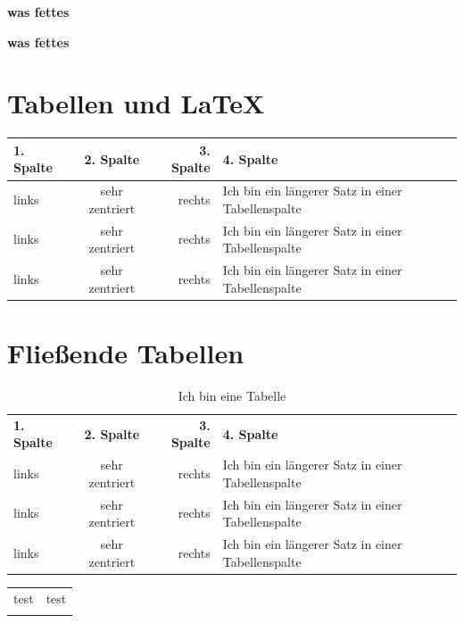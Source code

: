 \documentclass[12pt,ngerman,parskip=half]{scrreprt}
\begin{document}
\textbf{was fettes}

{\bfseries was fettes}


\section{Tabellen und \LaTeX}

\begin{tabular}{|l|c|r|p{6cm}|} \hline
1. Spalte & 2. Spalte & 3. Spalte & 4. Spalte \\ \hline
links & sehr zentriert&   rechts  & Ich bin ein längerer Satz in einer Tabellenspalte  \\ \hline
links & sehr zentriert&   rechts  & Ich bin ein längerer Satz in einer Tabellenspalte  \\ \hline
links & sehr zentriert&   rechts  & Ich bin ein längerer Satz in einer Tabellenspalte  \\ \hline
\end{tabular}

\section{Fließende Tabellen}

\blindtext[2]

\begin{table}
\begin{center}
\caption{Ich bin eine Tabelle}\label{tab:tabelle1}
\begin{tabular}{lcrp{6cm}} \toprule[3pt] 
\textbf{1. Spalte} & \textbf{2. Spalte} & \textbf{3. Spalte} & \textbf{4. Spalte} \\ \addlinespace[5mm] \midrule 
links & sehr zentriert&   rechts  & Ich bin ein längerer Satz in einer Tabellenspalte  \\ \midrule[1pt]
links & sehr zentriert&   rechts  & Ich bin ein längerer Satz in einer Tabellenspalte  \\ 
links & sehr zentriert&   rechts  & Ich bin ein längerer Satz in einer Tabellenspalte  \\  \bottomrule[1.5pt]
\end{tabular}
\end{center}
\end{table}




\blindtext[2]

 \begin{tabular}{l!{\color{green}\vrule}l}
    \hline
    test & test\\\hline
  \end{tabular}
\end{document}
